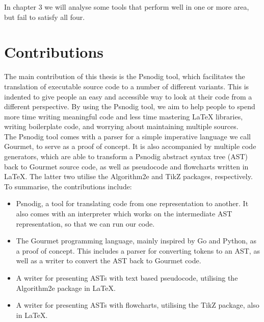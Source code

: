

In chapter 3 we will analyse some tools that perform well in one or more area, but fail to satisfy all four.

\section{Contributions}

The main contribution of this thesis is the Psnodig tool, which facilitates the translation of executable source code to a number of different variants. This is indented to give people an easy and accessible way to look at their code from a different perspective. By using the Psnodig tool, we aim to help people to spend more time writing meaningful code and less time mastering LaTeX libraries, writing boilerplate code, and worrying about maintaining multiple sources. \\

The Psnodig tool comes with a parser for a simple imperative language we call Gourmet, to serve as a proof of concept. It is also accompanied by multiple code generators, which are able to transform a Psnodig abstract syntax tree (AST) back to Gourmet source code, as well as pseudocode and flowcharts written in LaTeX. The latter two utilise the Algorithm2e and TikZ packages, respectively. \\

To summarise, the contributions include:
\begin{itemize}
    \item Psnodig, a tool for translating code from one representation to another. It also comes with an interpreter which works on the intermediate AST representation, so that we can run our code.
    \item The Gourmet programming language, mainly inspired by Go and Python, as a proof of concept. This includes a parser for converting tokens to an AST, as well as a writer to convert the AST back to Gourmet code.
    \item A writer for presenting ASTs with text based pseudocode, utilising the Algorithm2e package in LaTeX.
    \item A writer for presenting ASTs with flowcharts, utilising the TikZ package, also in LaTeX.
\end{itemize}

